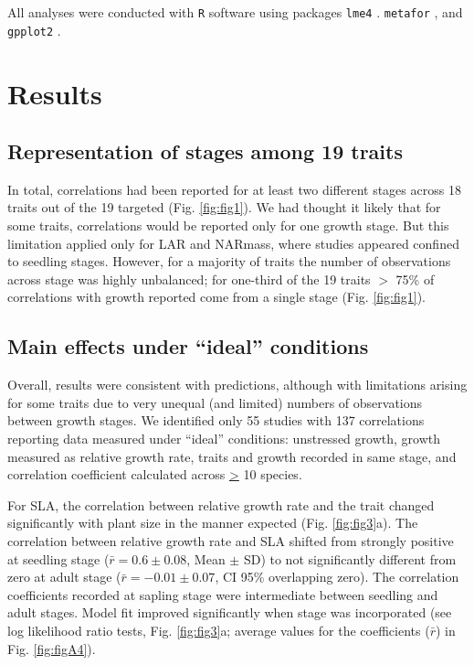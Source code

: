 \documentclass[a4paper,11pt]{article}
\begin{document}
All analyses were conducted with \texttt{R} software \citep{Ralanguageanden:2014wf} using packages \texttt{lme4} \citep{Bates-2014}. \texttt{metafor} \citep{Viechtbauer-2010}, and \texttt{gpplot2} \citep{Wickham:2009}.


\section*{Results}\label{results}

\subsection*{Representation of stages among 19 traits}
In total, correlations had been reported for at least two different stages across 18 traits out of the 19 targeted (Fig. \ref{fig:fig1}). We had thought it likely that for some traits, correlations would be reported only for one growth stage. But this limitation applied only for LAR and NARmass, where studies appeared confined to seedling stages. However, for a majority of traits the number of observations across stage was highly unbalanced; for one-third of the 19 traits $>$ 75\% of correlations with growth reported come from a single stage (Fig. \ref{fig:fig1}).

\subsection*{Main effects under ``ideal'' conditions}

Overall, results were consistent with predictions, although with limitations arising for some traits due to very unequal (and limited) numbers of observations between growth stages. We identified only 55 studies with 137 correlations reporting data measured under ``ideal'' conditions: unstressed growth, growth measured as relative growth rate, traits and growth recorded in same stage, and correlation coefficient calculated across \underline{\textgreater} 10 species.

For SLA, the correlation between relative growth rate and the trait changed significantly with plant size in the manner expected (Fig. \ref{fig:fig3}a). The correlation between relative growth rate and SLA shifted from strongly positive at seedling stage ($\bar{r}=0.6 \pm 0.08$, Mean $\pm$ SD) to not significantly different from zero at adult stage ($\bar{r}= -0.01 \pm 0.07$, CI 95\% overlapping zero). The correlation coefficients recorded at sapling stage were intermediate between seedling and adult stages. Model fit improved significantly when stage was incorporated (see log likelihood ratio tests, Fig. \ref{fig:fig3}a; average values for the coefficients ($\bar{r}$) in Fig. \ref{fig:figA4}).
\end{document}
